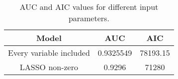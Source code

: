     \begin{table}[H]
        \centering
            \begin{tabular}{c|c|c}
            Model & AUC & AIC \\\hline
            Every variable included & 0.9325549 & 78193.15\\
            LASSO non-zero &  0.9296 & 71280\\
            
		    \end{tabular}
            \caption{AUC and AIC values for different input parameters.}
	        \label{ModelAICandAUC}
    \end{table}
